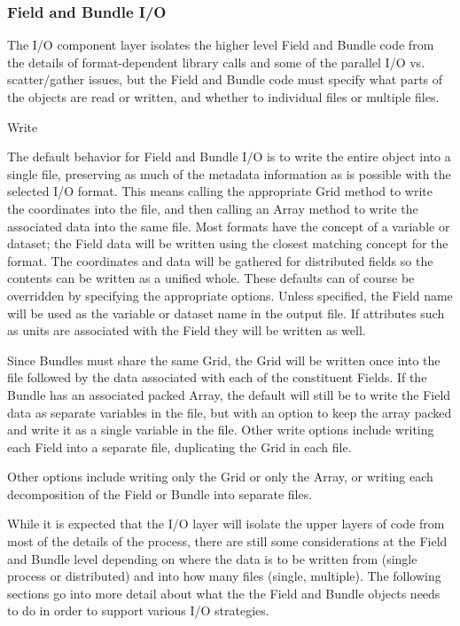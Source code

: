 \subsubsection{Field and Bundle I/O}

The I/O component layer isolates the higher level Field
and Bundle
code from the details of format-dependent library calls
and some of the parallel I/O vs. scatter/gather issues, 
but the Field and Bundle code must specify 
what parts of the objects are read or written, and
whether to individual files or multiple files.  


\begin{description}

\item{Write}

The default behavior for Field and Bundle I/O
is to write the entire object into a single file,
preserving as much of the metadata information as is
possible with the selected I/O format.  This means
calling the appropriate Grid method to write the coordinates
into the file, and then calling an Array method to
write the associated data into the same file.  
Most formats have the concept of a variable or dataset;
the Field data will be written using the closest matching
concept for the format.  The coordinates and data will
be gathered for distributed fields so the contents can
be written as a unified whole.  These defaults can of
course be overridden by specifying the appropriate options.
Unless specified, the Field name will be used as the
variable or dataset name in the output file.
If attributes such as units are associated with the
Field they will be written as well.  

Since Bundles must share the same Grid, the Grid
will be written once into the file followed by the
data associated with each of the constituent Fields.
If the Bundle has an associated packed Array, the
default will still be to write the Field data as separate
variables in the file, but with an option to keep the
array packed and write it as a single variable in the file.
Other write options include writing each Field into a
separate file, duplicating the Grid in each file.

Other options include writing only the Grid or only the
Array, or writing each decomposition of the Field
or Bundle into separate files.

While it is expected that the I/O layer will isolate the
upper layers of code from most of the details of the
process, there are still some considerations at the
Field and Bundle level depending on 
where the data
is to be written from (single process or distributed) and into
how many files (single, multiple).
The following sections go into more detail about what the
the Field and Bundle objects needs to do in order to 
support various I/O strategies.


\end{description}
